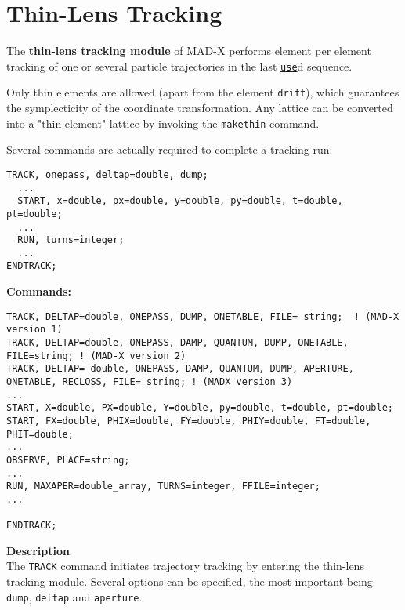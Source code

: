 
\chapter{Thin-Lens Tracking} %

The \textbf{thin-lens tracking module} of MAD-X performs element per
element tracking of one or several particle trajectories in the last
\href{../control/general.html#use}{\texttt{use}}d sequence.  
 

Only thin elements are allowed (apart from the element \texttt{drift}),
which guarantees the symplecticity of the coordinate transformation. Any
lattice can be converted into a "thin element" lattice by invoking the
\href{../makethin/makethin.html}{\texttt{makethin}} command. 

Several commands are actually required to complete a tracking run:

\begin{verbatim}
TRACK, onepass, deltap=double, dump; 
  ...
  START, x=double, px=double, y=double, py=double, t=double, pt=double;  
  ...
  RUN, turns=integer;
  ...
ENDTRACK;
\end{verbatim}

{\bf Commands:}
\begin{verbatim}
TRACK, DELTAP=double, ONEPASS, DUMP, ONETABLE, FILE= string;  ! (MAD-X version 1)
TRACK, DELTAP=double, ONEPASS, DAMP, QUANTUM, DUMP, ONETABLE, FILE=string; ! (MAD-X version 2)
TRACK, DELTAP= double, ONEPASS, DAMP, QUANTUM, DUMP, APERTURE, ONETABLE, RECLOSS, FILE= string; ! (MADX version 3)
...
START, X=double, PX=double, Y=double, py=double, t=double, pt=double;
START, FX=double, PHIX=double, FY=double, PHIY=double, FT=double, PHIT=double;  
...
OBSERVE, PLACE=string;  
...
RUN, MAXAPER=double_array, TURNS=integer, FFILE=integer;  
...

ENDTRACK;
\end{verbatim}

{\bf Description}  \\
The \texttt{TRACK} command initiates trajectory tracking by entering the 
thin-lens tracking module. Several options can be specified, the most 
important being \texttt{dump}, \texttt{deltap} and
\texttt{aperture}. 
          
